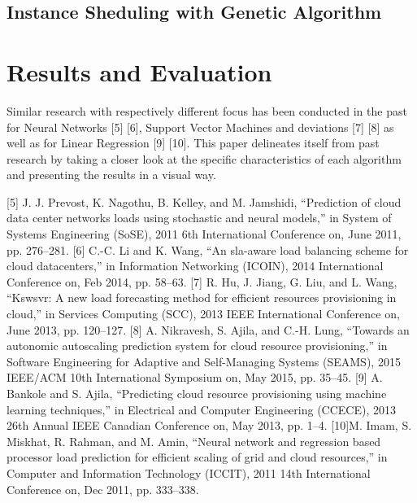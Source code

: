 \subsection{Instance Sheduling with Genetic Algorithm}

\section{Results and Evaluation}



Similar research with respectively different focus has been conducted in the past for Neural Networks [5] [6], Support Vector Machines and deviations [7] [8] as well as for Linear Regression [9] [10]. This paper delineates itself from past research by taking a closer look at the specific characteristics of each algorithm and presenting the results in a visual way.

[5] J. J. Prevost, K. Nagothu, B. Kelley, and M. Jamshidi, “Prediction of
cloud data center networks loads using stochastic and neural models,”
in System of Systems Engineering (SoSE), 2011 6th International Conference
on, June 2011, pp. 276–281.
[6] C.-C. Li and K. Wang, “An sla-aware load balancing scheme for cloud
datacenters,” in Information Networking (ICOIN), 2014 International
Conference on, Feb 2014, pp. 58–63.
[7] R. Hu, J. Jiang, G. Liu, and L. Wang, “Kswsvr: A new load forecasting
method for efficient resources provisioning in cloud,” in Services Computing
(SCC), 2013 IEEE International Conference on, June 2013, pp.
120–127.
[8] A. Nikravesh, S. Ajila, and C.-H. Lung, “Towards an autonomic autoscaling
prediction system for cloud resource provisioning,” in Software
Engineering for Adaptive and Self-Managing Systems (SEAMS), 2015
IEEE/ACM 10th International Symposium on, May 2015, pp. 35–45.
[9] A. Bankole and S. Ajila, “Predicting cloud resource provisioning using
machine learning techniques,” in Electrical and Computer Engineering
(CCECE), 2013 26th Annual IEEE Canadian Conference on, May 2013,
pp. 1–4.
[10]M. Imam, S. Miskhat, R. Rahman, and M. Amin, “Neural network and
regression based processor load prediction for efficient scaling of grid
and cloud resources,” in Computer and Information Technology (ICCIT),
2011 14th International Conference on, Dec 2011, pp. 333–338.


